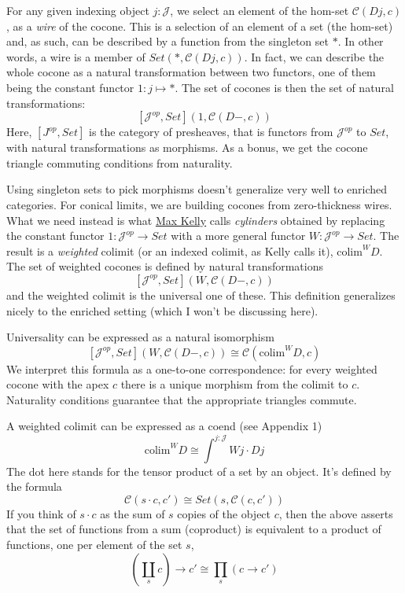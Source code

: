 \documentclass[11pt]{amsart}
\begin{document}
\begin{figure}[H]
\end{figure}
For any given indexing object $j \colon \mathcal{J}$, we select an element of the hom-set $\mathcal{C}(D j, c)$, as a \emph{wire} of the cocone. This is a selection of an element of a set (the hom-set) and, as such, can be described by a function from the singleton set $*$. In other words, a wire is a member of $Set(*, \mathcal{C}(D j, c))$. In fact, we can describe the whole cocone as a natural transformation between two functors, one of them being the constant functor $1 \colon j \mapsto *$. The set of cocones is then the set of natural transformations:
\[ [\mathcal{J}^{op}, Set](1, \mathcal{C}(D -, c))\]
Here, $[J^{op}, Set]$ is the category of presheaves, that is functors from $\mathcal{J}^{op}$ to $Set$, with natural transformations as morphisms. As a bonus, we get the cocone triangle commuting conditions from naturality. 

Using singleton sets to pick morphisms doesn't generalize very well to enriched categories. For conical limits, we are building cocones from zero-thickness wires. What we need instead is what \href{http://www.tac.mta.ca/tac/reprints/articles/10/tr10.pdf}{Max Kelly} calls \emph{cylinders} obtained by replacing the constant functor $1\colon \mathcal{J}^{op} \to Set$ with a more general functor $W \colon \mathcal{J}^{op} \to Set$. The result is a \emph{weighted} colimit (or an indexed colimit, as Kelly calls it), $\mbox{colim}^W D$. The set of weighted cocones is defined by natural transformations
\[ [\mathcal{J}^{op}, Set](W, \mathcal{C}(D -, c))\]
and the weighted colimit is the universal one of these. This definition generalizes nicely to the enriched setting (which I won't be discussing here). 

Universality can be expressed as a natural isomorphism
\[[\mathcal{J}^{op}, Set](W, \mathcal{C}(D -, c))  \cong  \mathcal{C}(\mbox{colim}^W D, c)\]
We interpret this formula as a one-to-one correspondence: for every weighted cocone with the apex $c$ there is a unique morphism from the colimit to $c$. Naturality conditions guarantee that the appropriate triangles commute.

A weighted colimit can be expressed as a coend (see Appendix 1)
\[\mbox{colim}^W D \cong \int^{j \colon \mathcal{J}} W j \cdot D j\]
The dot here stands for the tensor product of a set by an object. It's defined by the formula
\[\mathcal{C}(s \cdot c, c') \cong Set(s, \mathcal{C}(c, c'))\]
If you think of $s \cdot c$ as the sum of $s$ copies of the object $c$, then the above asserts that the set of functions from a sum (coproduct) is equivalent to a product of functions, one per element of the set $s$,
\[(\coprod_s c) \to c' \cong \prod_s (c \to c')\]
 
\end{document}
